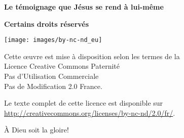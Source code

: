 \newpage
\mbox{}
\vfill

{\scriptsize

{\bfseries Le témoignage que Jésus se rend à lui-même}

{\bfseries Certains droits réservés}

\ifluatex
  \texttt{[image: images/by-nc-nd\_eu]}
\fi

Cette \oe{}uvre est mise à disposition selon les termes de la \\
 Licence Creative Commons Paternité \\
 \ocadr Pas d'Utilisation Commerciale \\
 \ocadr Pas de Modification 2.0 France.

Le texte complet de cette licence est disponible sur \\
 \url{http://creativecommons.org/licenses/by-nc-nd/2.0/fr/}.

À Dieu soit la gloire!

}
\enlargethispage{\footskip}
\pagebreak


